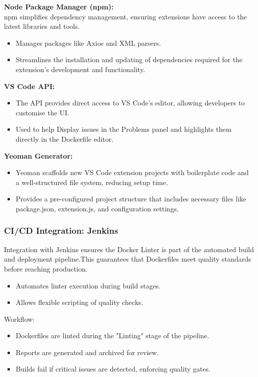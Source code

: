 \textbf{Node Package Manager (npm):}
\\npm simplifies dependency management, ensuring extensions have access to the latest libraries and tools. 
\begin{itemize}
    \item Manages packages like Axios and XML parsers. 
    \item Streamlines the installation and updating of dependencies required for the extension's development and functionality. 
\end{itemize}

\textbf{VS Code API:}
\begin{itemize}
    \item The API provides direct access to VS Code's editor, allowing developers to  customise the UI. 
    \item Used to help Display issues in the Problems panel and highlights them directly in the Dockerfile editor.
\end{itemize} 

\textbf{Yeoman Generator:}
\begin{itemize}
    \item Yeoman scaffolds new VS Code extension projects with boilerplate code and a well-structured file system, reducing setup time.
    \item Provides a pre-configured project structure that includes necessary files like package.json, extension.js, and configuration settings.
    \end{itemize}

\subsubsection{CI/CD Integration: Jenkins}
Integration with Jenkins ensures the Docker Linter is part of the automated build and deployment pipeline.This guarantees that Dockerfiles meet quality standards before reaching production. 
\begin{itemize}
    \item Automates linter execution during build stages.
    \item Allows flexible scripting of quality checks.
\end{itemize}
Workflow: 
\begin{itemize}
    \item Dockerfiles are linted during the "Linting" stage of the pipeline.
    \item Reports are generated and archived for review.
    \item Builds fail if critical issues are detected, enforcing quality gates.
\end{itemize}

